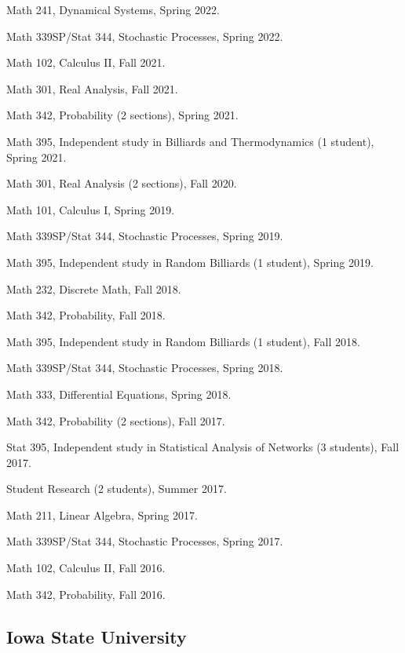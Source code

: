 \documentclass[10pt,letterpaper]{article}
\renewenvironment{itemize}{
  \begin{list}{}{
    \setlength{\leftmargin}{1.5em}
    \setlength{\itemsep}{0.25em}
    \setlength{\parskip}{0pt}
    \setlength{\parsep}{0.25em}
  }
}{
  \end{list}
}
\begin{document}
\begin{itemize}
\item
  Math 241, Dynamical Systems, Spring 2022.
\item
  Math 339SP/Stat 344, Stochastic Processes, Spring 2022.
\item
  Math 102, Calculus II, Fall 2021.
\item
  Math 301, Real Analysis, Fall 2021.
\item
  Math 342, Probability (2 sections), Spring 2021.
\item
  Math 395, Independent study in Billiards and Thermodynamics (1
  student), Spring 2021.
\item
  Math 301, Real Analysis (2 sections), Fall 2020.
\item
  Math 101, Calculus I, Spring 2019.
\item
  Math 339SP/Stat 344, Stochastic Processes, Spring 2019.
\item
  Math 395, Independent study in Random Billiards (1 student), Spring
  2019.
\item
  Math 232, Discrete Math, Fall 2018.
\item
  Math 342, Probability, Fall 2018.
\item
  Math 395, Independent study in Random Billiards (1 student), Fall
  2018.
\item
  Math 339SP/Stat 344, Stochastic Processes, Spring 2018.
\item
  Math 333, Differential Equations, Spring 2018.
\item
  Math 342, Probability (2 sections), Fall 2017.
\item
  Stat 395, Independent study in Statistical Analysis of Networks (3
  students), Fall 2017.
\item
  Student Research (2 students), Summer 2017.
\item
  Math 211, Linear Algebra, Spring 2017.
\item
  Math 339SP/Stat 344, Stochastic Processes, Spring 2017.
\item
  Math 102, Calculus II, Fall 2016.
\item
  Math 342, Probability, Fall 2016.
\end{itemize}

\hypertarget{iowa-state-university}{%
\subsection*{Iowa State University}\label{iowa-state-university}}
\end{document}
